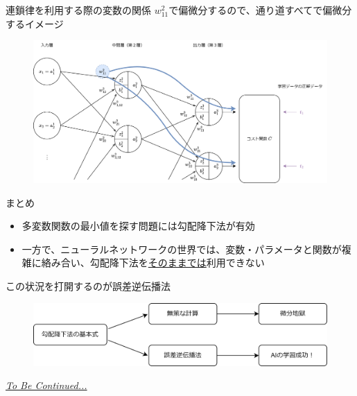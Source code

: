 \documentclass[dvipdfmx,aspectratio=169]{beamer}
\begin{document}
	\begin{frame}{連鎖律を利用する際の変数の関係}
		$ w^2_{11} $で偏微分するので、通り道すべてで偏微分するイメージ
		\begin{figure}
			\centering
			\includegraphics[width=0.85\linewidth]{img/relationships-between-varialbes-when-using-the-chain-rule}
		\end{figure}
	\end{frame}
	\begin{frame}{まとめ}
		\begin{itemize}
			\item 多変数関数の最小値を探す問題には勾配降下法が有効
			\item 一方で、ニューラルネットワークの世界では、変数・パラメータと関数が複雑に絡み合い、勾配降下法を\underline{そのままでは}利用できない
		\end{itemize}
		\begin{center}
			この状況を打開するのが\alert{誤差逆伝播法}
		\end{center}
		\begin{figure}
			\centering
			\includegraphics[width=0.9\linewidth]{img/positioning-of-the-error-back-propagation-method}
		\end{figure}
	\end{frame}	
	\begin{frame}
		\begin{center}
			\textit{\uline{To Be Continued...}}
		\end{center}
	\end{frame}
	
\end{document}
